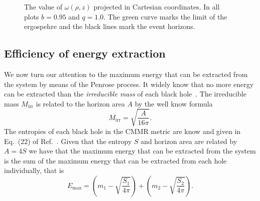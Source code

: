\begin{figure}
{    \label{ch:penrose_binaries/fig:omega_dens_c}
  }
  \caption{The value of $\omega(\rho,z)$ projected in Cartesian coordinates. In all plots $b=0.95$ and $q=1.0$. The green curve marks the limit of the ergospehre and the black lines mark the event horizons.}
  \label{ch:penrose_binaries/fig:omega_value_regions}
\end{figure}

\subsection{Efficiency of energy extraction}

We now turn our attention to the maximum energy that can be extracted from the system by means of the Penrose process. It widely know that no more energy can be extracted than the \textit{irreducible mass} of each black hole~\cite{RUFFINI1971,CHRISTODOULOU1970,CARROLL}. The irreducible mass $M_{\text{irr}}$ is related to the horizon area $A$ by the well know formula~\cite{CARROLL}
%
\begin{equation}
  M_{\text{irr}} = \sqrt{\frac{A}{16\pi}}.
  \label{ch:penrose_binaries/eq:irreducible_mass}
\end{equation}
%
The entropies of each black hole in the CMMR metric are know and given in Eq.~(22) of Ref.~\cite{MANKO2020}. Given that the entropy $S$ and horizon area are related by $A=4S$ we have that the maximum energy that can be extracted from the system is the sum of the maximum energy that can be extracted from each hole individually, that is
%
\begin{equation}
  E_{\text{max}} = \left(m_1 - \sqrt{\frac{S_1}{4\pi}}\right) + \left(m_2 - \sqrt{\frac{S_2}{4\pi}}\right).
  \label{ch:penrose_binaries/eq:max_extract_energy}
\end{equation}

